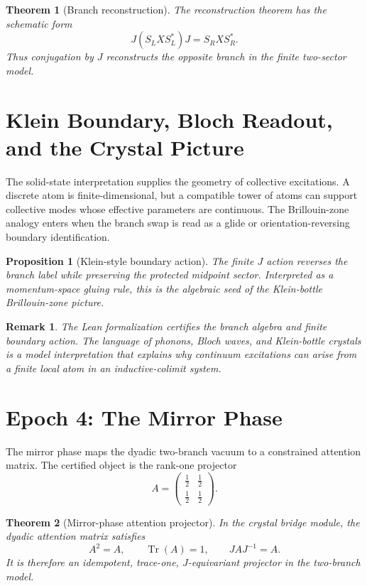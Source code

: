 \documentclass[11pt,a4paper]{article}
\newtheorem{theorem}{Theorem}
\newtheorem{proposition}{Proposition}
\newtheorem{remark}{Remark}
\newcommand{\Tr}{\operatorname{Tr}}
\begin{document}
\begin{theorem}[Branch reconstruction]
The reconstruction theorem has the schematic form
\[
  J (S_L X S_L^*) J = S_R X S_R^*.
\]
Thus conjugation by $J$ reconstructs the opposite branch in the finite two-sector model.
\end{theorem}

\section{Klein Boundary, Bloch Readout, and the Crystal Picture}

The solid-state interpretation supplies the geometry of collective excitations. A discrete atom is finite-dimensional, but a compatible tower of atoms can support collective modes whose effective parameters are continuous. The Brillouin-zone analogy enters when the branch swap is read as a glide or orientation-reversing boundary identification.

\begin{proposition}[Klein-style boundary action]
The finite $J$ action reverses the branch label while preserving the protected midpoint sector. Interpreted as a momentum-space gluing rule, this is the algebraic seed of the Klein-bottle Brillouin-zone picture.
\end{proposition}

\begin{remark}
The Lean formalization certifies the branch algebra and finite boundary action. The language of phonons, Bloch waves, and Klein-bottle crystals is a model interpretation that explains why continuum excitations can arise from a finite local atom in an inductive-colimit system.
\end{remark}

\section{Epoch 4: The Mirror Phase}

The mirror phase maps the dyadic two-branch vacuum to a constrained attention matrix. The certified object is the rank-one projector
\[
  A =
  \begin{pmatrix}
    \frac12 & \frac12 \\
    \frac12 & \frac12
  \end{pmatrix}.
\]

\begin{theorem}[Mirror-phase attention projector]
In the crystal bridge module, the dyadic attention matrix satisfies
\[
  A^2 = A,\qquad \Tr(A)=1,\qquad JAJ^{-1}=A.
\]
It is therefore an idempotent, trace-one, $J$-equivariant projector in the two-branch model.
\end{theorem}
\end{document}
